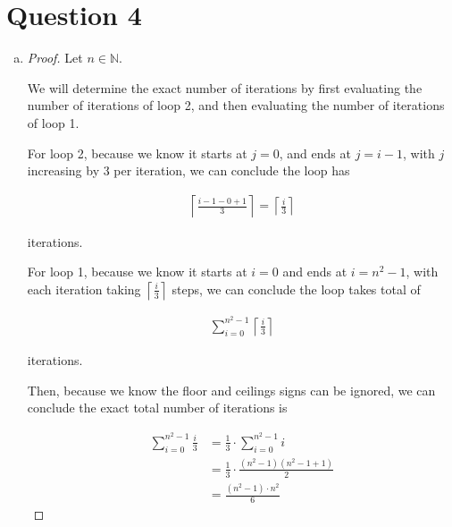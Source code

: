 \documentclass[12pt]{article}
\begin{document}
\section*{Question 4}
\begin{enumerate}[a.]
    \item

    \begin{proof}
        Let $n \in \mathbb{N}$.

        \bigskip

        We will determine the exact number of iterations by first evaluating the
        number of iterations of loop 2, and then evaluating the number of iterations
        of loop 1.

        \bigskip

        For loop 2, because we know it starts at $j = 0$, and ends at $j = i - 1$,
        with $j$ increasing by 3 per iteration, we can conclude the loop has

        \setcounter{equation}{0}
        \begin{align}
            \left\lceil \frac{i-1-0+1}{3} \right\rceil = \left\lceil \frac{i}{3} \right\rceil
        \end{align}

        iterations.

        \bigskip

        For loop 1, because we know it starts at $i = 0$ and ends at $i = n^2-1$,
        with each iteration taking $\left\lceil \frac{i}{3} \right\rceil$
        steps, we can conclude the loop takes total of

        \begin{align}
            \sum\limits_{i=0}^{n^2-1} \left\lceil \frac{i}{3} \right\rceil
        \end{align}

        iterations.

        \bigskip

        Then, because we know the floor and ceilings signs can be ignored,
        we can conclude the exact total number of iterations is

        \begin{align}
            \sum\limits_{i=0}^{n^2-1} \frac{i}{3} &= \frac{1}{3} \cdot \sum\limits_{i=0}^{n^2-1} i\\
            &= \frac{1}{3} \cdot \frac{(n^2 - 1)(n^2 -1 + 1)}{2}\\
            &= \frac{(n^2 - 1) \cdot n^2}{6}
        \end{align}
    \end{proof}

\end{enumerate}
\end{document}
